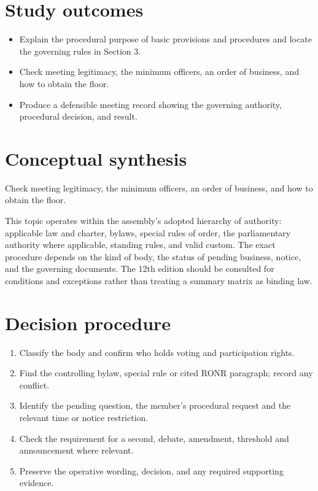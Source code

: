 \documentclass[11pt]{article}
\begin{document}
\SuiteOpen
{}
\section{Study outcomes}
\begin{itemize}[leftmargin=*,itemsep=4pt]
\item Explain the procedural purpose of basic provisions and procedures and locate the governing rules in Section 3.
\item Check meeting legitimacy, the minimum officers, an order of business, and how to obtain the floor.
\item Produce a defensible meeting record showing the governing authority, procedural decision, and result.
\end{itemize}

\section{Conceptual synthesis}
Check meeting legitimacy, the minimum officers, an order of business, and how to obtain the floor.

This topic operates within the assembly’s adopted hierarchy of authority: applicable law and charter, bylaws, special rules of order, the parliamentary authority where applicable, standing rules, and valid custom. The exact procedure depends on the kind of body, the status of pending business, notice, and the governing documents. The 12th edition should be consulted for conditions and exceptions rather than treating a summary matrix as binding law.
\section{Decision procedure}
\begin{enumerate}[leftmargin=*,itemsep=4pt]
\item Classify the body and confirm who holds voting and participation rights.
\item Find the controlling bylaw, special rule or cited RONR paragraph; record any conflict.
\item Identify the pending question, the member’s procedural request and the relevant time or notice restriction.
\item Check the requirement for a second, debate, amendment, threshold and announcement where relevant.
\item Preserve the operative wording, decision, and any required supporting evidence.
\end{enumerate}
\end{document}
